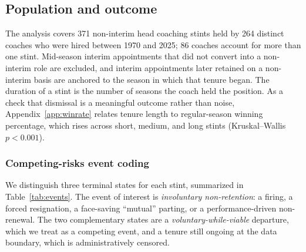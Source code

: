 \documentclass[USenglish]{article}
\theoremstyle{dgthm}
\theoremstyle{dgdef}
\begin{document}
\subsection{Population and outcome}

The analysis covers 371 non-interim head coaching stints held by 264 distinct coaches who were hired between 1970 and 2025; 86 coaches account for more than one stint. Mid-season interim appointments that did not convert into a non-interim role are excluded, and interim appointments later retained on a non-interim basis are anchored to the season in which that tenure began. The duration of a stint is the number of seasons the coach held the position. As a check that dismissal is a meaningful outcome rather than noise, Appendix~\ref{app:winrate} relates tenure length to regular-season winning percentage, which rises across short, medium, and long stints (Kruskal--Wallis $p < 0.001$).

\subsubsection{Competing-risks event coding}
\label{sec:coding}

We distinguish three terminal states for each stint, summarized in Table~\ref{tab:events}. The event of interest is \emph{involuntary non-retention}: a firing, a forced resignation, a face-saving ``mutual'' parting, or a performance-driven non-renewal. The two complementary states are a \emph{voluntary-while-viable} departure, which we treat as a competing event, and a tenure still ongoing at the data boundary, which is administratively censored.
\end{document}
